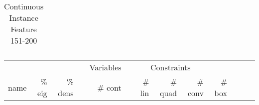 \begin{table}
\begin{tabular}{lrrrrrrrrrrrr}
														


\bottomrule

\end{tabular}  
\label{tab:B4}
\caption{Continuous  Instance Feature 151-200} 

\end{table}

\begin{table}
 \centering
 \setlength{\tabcolsep}{11pt}
 \renewcommand \arraystretch{1}
\begin{tabular}{lrrrrrrrrrrrr}
\toprule

		&		&		&	&	\multicolumn{1}{c}{Variables}	&	&	\multicolumn{3}{c}{Constraints}							\\
\cmidrule(lr){5-5} \cmidrule(lr){7-10}																	
name	&	\% eig	&	\% dens	&	&	\# cont 	&	&	\# lin 	&	\# quad 	&	\# conv 	&	\# box	\\
\cmidrule(lr){5-5} \cmidrule(lr){7-10}																	
		 


\end{tabular}
\end{table}
